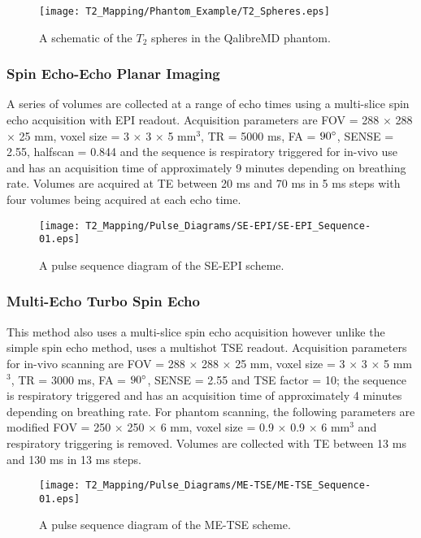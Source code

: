 \begin{figure}[H]
	\centering
	\texttt{[image: T2\_Mapping/Phantom\_Example/T2\_Spheres.eps]}
	\caption{A schematic of the $T_2$ spheres in the QalibreMD phantom.}
	\label{fig:t2_phantom_schematic}	
\end{figure}

\subsubsection{Spin Echo-Echo Planar Imaging}
A series of volumes are collected at a range of echo times using a multi-slice spin echo acquisition with \ac{EPI} readout. Acquisition parameters are \ac{FOV} = 288 $\times$ 288 $\times$ 25 mm, voxel size = 3 $\times$ 3 $\times$ 5 mm$^3$, \ac{TR} = 5000 ms, \ac{FA} = $90\degree$, \ac{SENSE} = 2.55, halfscan = 0.844 and the sequence is respiratory triggered for in-vivo use and has an acquisition time of approximately 9 minutes depending on breathing rate. Volumes are acquired at \ac{TE} between 20 ms and 70 ms in 5 ms steps with four volumes being acquired at each echo time. 

\begin{figure}[H]
	\centering
	\texttt{[image: T2\_Mapping/Pulse\_Diagrams/SE-EPI/SE-EPI\_Sequence-01.eps]}
	\caption{A pulse sequence diagram of the \ac{SE}-\ac{EPI} scheme.}
	\label{fig:t2_se-epi_seq}	
\end{figure}

\subsubsection{Multi-Echo Turbo Spin Echo}

This method also uses a multi-slice spin echo acquisition however unlike the simple spin echo method, uses a multishot \ac{TSE} readout. Acquisition parameters for in-vivo scanning are \ac{FOV} = 288 $\times$ 288 $\times$ 25 mm, voxel size = 3 $\times$ 3 $\times$ 5 mm$^3$, \ac{TR} = 3000 ms, \ac{FA} = $90\degree$, \ac{SENSE} = 2.55 and \ac{TSE} factor = 10; the sequence is respiratory triggered and has an acquisition time of approximately 4 minutes depending on breathing rate. For phantom scanning, the following parameters are modified \ac{FOV} = 250 $\times$ 250 $\times$ 6 mm, voxel size = 0.9 $\times$ 0.9 $\times$ 6 mm$^3$ and respiratory triggering is removed. Volumes are collected with \ac{TE} between 13 ms and 130 ms in 13 ms steps.

\begin{figure}[H]
	\centering
	\texttt{[image: T2\_Mapping/Pulse\_Diagrams/ME-TSE/ME-TSE\_Sequence-01.eps]}
	\caption{A pulse sequence diagram of the \ac{ME-TSE} scheme.}
	\label{fig:t2_me-tse_seq}	
\end{figure}

